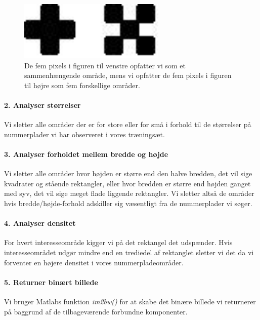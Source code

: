 \begin{figure}[htp]
\centering
\includegraphics[width=7cm]{implementation/illu/con_comp-connections.jpg}
\caption{De fem pixels i figuren til venstre opfatter vi som et sammenhængende område, mens vi opfatter de fem pixels i figuren til højre som fem forskellige områder.}
\label{fig:con_comp-connections}
\end{figure}

\paragraph{2. Analyser størrelser}
Vi sletter alle områder der er for store eller for små i forhold til de størrelser på nummerplader vi har observeret i vores træningsæt.

\paragraph{3. Analyser forholdet mellem bredde og højde}
Vi sletter alle områder hvor højden er større end den halve bredden, det vil sige kvadrater og stående rektangler, eller hvor bredden er større end højden ganget med syv, det vil sige meget flade liggende rektangler. Vi sletter altså de områder hvis bredde/højde-forhold adskiller sig væsentligt fra de nummerplader vi søger.

\paragraph{4. Analyser densitet}
For hvert interesseområde kigger vi på det rektangel det udspænder. Hvis interesseområdet udgør mindre end en trediedel af rektanglet sletter vi det da vi forventer en højere densitet i vores nummerpladeområder.

\paragraph{5. Returner binært billede}
Vi bruger Matlabs funktion \textit{im2bw()} for at skabe det binære billede vi returnerer på baggrund af de tilbageværende forbundne komponenter. 

